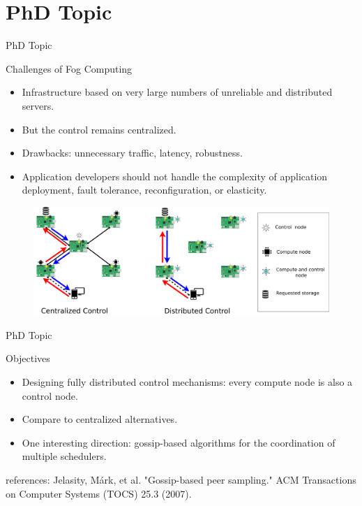 \documentclass{beamer}
\begin{document}
\section{PhD Topic}
\begin{frame}{PhD Topic}
 \begin{block}{Challenges of Fog Computing}
    \begin{itemize}
    \item Infrastructure based on very large numbers of unreliable and distributed servers.
    \item<2-> But the control remains centralized.
    \item<3-> Drawbacks: unnecessary traffic, latency, robustness.
    \item<4-> Application developers should not handle the complexity of application deployment, fault tolerance, reconfiguration, or elasticity.
      
    \end{itemize}
    
    \end{block}
    
    \begin{figure}[ht]


 \includegraphics[width=.85\linewidth]{fog.png}
\end{figure}
\end{frame}

\begin{frame}{PhD Topic}


\begin{block}{Objectives}
    \begin{itemize}
    
    \item Designing fully distributed control mechanisms: every compute node is also a control node. 
    \item<2->  Compare to centralized alternatives. 
    \item<3->  One interesting direction: gossip-based algorithms for the coordination of multiple schedulers.
      
    \end{itemize}
    
    \end{block}
 {\tiny *references: Jelasity, Márk, et al. "Gossip-based peer sampling." ACM Transactions on Computer Systems (TOCS) 25.3 (2007).}    
    
 \end{frame}
    
\end{document}
